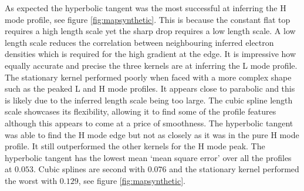 
As expected the hyperbolic tangent was the most successful at inferring the H mode profile, see figure \ref{fig:mapsynthetic}. This is because the constant flat top requires a high length scale yet the sharp drop requires a low length scale. A low length scale reduces the correlation between neighbouring inferred electron densities which is required for the high gradient at the edge. It is impressive how equally accurate and precise the three kernels are at inferring the L mode profile. The stationary kernel performed poorly when faced with a more complex shape such as the peaked L and H mode profiles. It appears close to parabolic and this is likely due to the inferred length scale being too large. The cubic spline length scale showcases its flexibility, allowing it to find some of the profile features although this appears to come at a price of smoothness. The hyperbolic tangent was able to find the H mode edge but not as closely as it was in the pure H mode profile. It still outperformed the other kernels for the H mode peak. The hyperbolic tangent has the lowest mean `mean square error' over all the profiles at $0.053$. Cubic splines are second with $0.076$ and the stationary kernel performed the worst with $0.129$, see figure \ref{fig:mapsynthetic}.

